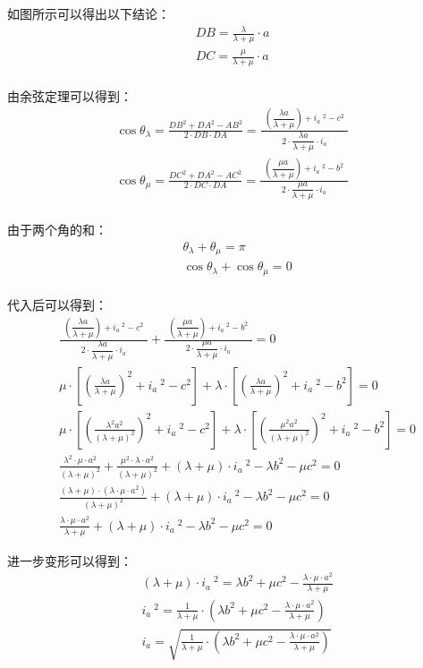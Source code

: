\documentclass[UTF8]{ctexart}
\begin{document}
    如图所示可以得出以下结论：
    \setcounter{equation}{0}
    \begin{align}
        DB=\frac{\lambda}{\lambda+\mu}\cdot a\\[3mm]
        DC=\frac{\mu}{\lambda+\mu}\cdot a
    \end{align}\\
    由余弦定理可以得到：
    \begin{align}
        \cos{\theta_{\lambda}}=\frac{DB^2+DA^2-AB^2}{2\cdot DB\cdot DA}=\frac{~~\left(\dfrac{\lambda a}{\lambda+\mu}\right)+i_a~^2-c^2~~}{2\cdot\dfrac{\lambda a}{\lambda+\mu}\cdot i_a}\\[5mm]
        \cos{\theta_{\mu}}=\frac{DC^2+DA^2-AC^2}{2\cdot DC\cdot DA}=\frac{~~\left(\dfrac{\mu a}{\lambda+\mu}\right)+i_a~^2-b^2~~}{2\cdot\dfrac{\mu a}{\lambda+\mu}\cdot i_a}
    \end{align}\\
    由于两个角的和：
    \begin{align}
        &\theta_{\lambda}+\theta_{\mu}=\pi\\[3mm]
        &\cos{\theta_{\lambda}}+\cos{\theta_{\mu}}=0
    \end{align}\\
    代入后可以得到：\vspace{8pt}
    \begin{align}
        &\frac{~~\left(\dfrac{\lambda a}{\lambda+\mu}\right)+i_a~^2-c^2~~}{2\cdot\dfrac{\lambda a}{\lambda+\mu}\cdot i_a}+\frac{~~\left(\dfrac{\mu a}{\lambda+\mu}\right)+i_a~^2-b^2~~}{2\cdot\dfrac{\mu a}{\lambda+\mu}\cdot i_a}=0\\[3mm]
        &\mu\cdot\left[\left(\frac{\lambda a}{\lambda+\mu}\right)^2+i_a~^2-c^2\right]+\lambda\cdot\left[\left(\frac{\lambda a}{\lambda+\mu}\right)^2+i_a~^2-b^2\right]=0\\[5mm]
        &\mu\cdot\left[\left(\frac{\lambda^2 a^2}{(\lambda+\mu)^2}\right)^2+i_a~^2-c^2\right]+\lambda\cdot\left[\left(\frac{\mu^2 a^2}{(\lambda+\mu)^2}\right)^2+i_a~^2-b^2\right]=0\\[7mm]
        &\frac{\lambda^2\cdot\mu\cdot a^2}{(\lambda+\mu)^2}+\frac{\mu^2\cdot\lambda\cdot a^2}{(\lambda+\mu)^2}+(\lambda+\mu)\cdot i_a~^2-\lambda b^2-\mu c^2=0\\[5mm]
        &\frac{(\lambda+\mu)\cdot\left(\lambda\cdot\mu\cdot a^2\right)}{(\lambda+\mu)^2}+(\lambda+\mu)\cdot i_a~^2-\lambda b^2-\mu c^2=0\\[5mm]
        &\frac{\lambda\cdot\mu\cdot a^2}{\lambda+\mu}+(\lambda+\mu)\cdot i_a~^2-\lambda b^2-\mu c^2=0
    \end{align}

\newpage

    进一步变形可以得到：
    \begin{align}
        &(\lambda+\mu)\cdot i_a~^2=\lambda b^2+\mu c^2-\frac{\lambda\cdot\mu\cdot a^2}{\lambda+\mu}\\[4mm]
        &i_a~^2=\frac{1}{\lambda+\mu}\cdot\left(\lambda b^2+\mu c^2-\frac{\lambda\cdot\mu\cdot a^2}{\lambda+\mu}\right)\\[4mm]
        &i_a=\sqrt{\frac{1}{\lambda+\mu}\cdot\left(\lambda b^2+\mu c^2-\frac{\lambda\cdot\mu\cdot a^2}{\lambda+\mu}\right)}
    \end{align}
\end{document}
